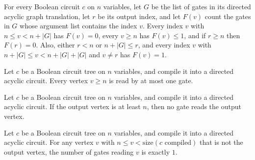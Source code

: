 \begin{theorem}
\label{BoolCircuit.TreeCircuit.toDAG_fanoutSpec}
\leanok
{}
For every Boolean circuit $c$ on $n$ variables, let $G$ be the list of gates in its
directed acyclic graph translation, let $r$ be its output index, and let $F(v)$ count
the gates in $G$ whose argument list contains the index $v$. Every index $v$ with $n\le
v<n+|G|$ has $F(v)=0$, every $v\ge n$ has $F(v)\le1$, and if $r\ge n$ then $F(r)=0$.
Also, either $r<n$ or $n+|G|\le r$, and every index $v$ with $n+|G|\le v<n+|G|+|G|$ and
$v\ne r$ has $F(v)=1$.
\end{theorem}

\begin{theorem}
\label{BoolCircuit.TreeCircuit.toDAG_fanout_le_one}
\leanok
{}
Let $c$ be a Boolean circuit tree on $n$ variables, and compile it into a directed
acyclic circuit. Every vertex $v \ge n$ is read by at most one gate.
\end{theorem}

\begin{theorem}
\label{BoolCircuit.TreeCircuit.toDAG_fanout_output}
\leanok
{}
Let $c$ be a Boolean circuit tree on $n$ variables, and compile it into a directed
acyclic circuit. If the output vertex is at least $n$, then no gate reads the output
vertex.
\end{theorem}

\begin{theorem}
\label{BoolCircuit.TreeCircuit.toDAG_fanout_eq_one}
\leanok
{}
Let $c$ be a Boolean circuit tree on $n$ variables, and compile it into a directed
acyclic circuit. For any vertex $v$ with $n \le v < \mathrm{size}(c\text{ compiled})$
that is not the output vertex, the number of gates reading $v$ is exactly $1$.
\end{theorem}

